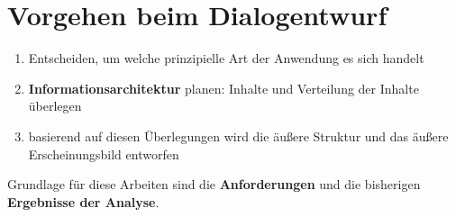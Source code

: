 \section{Vorgehen beim Dialogentwurf}

\begin{tcolorbox}[title=Vorgehen beim Dialogentwurf]
    \begin{enumerate}
        \item Entscheiden, um welche prinzipielle Art der Anwendung es sich handelt
        \item \textbf{Informationsarchitektur} planen: Inhalte und Verteilung der Inhalte überlegen
        \item basierend auf diesen Überlegungen wird die äußere Struktur und das äußere Erscheinungsbild entworfen
    \end{enumerate}

    \noindent
    Grundlage für diese Arbeiten sind die \textbf{Anforderungen} und die bisherigen \textbf{Ergebnisse der Analyse}.
\end{tcolorbox}
